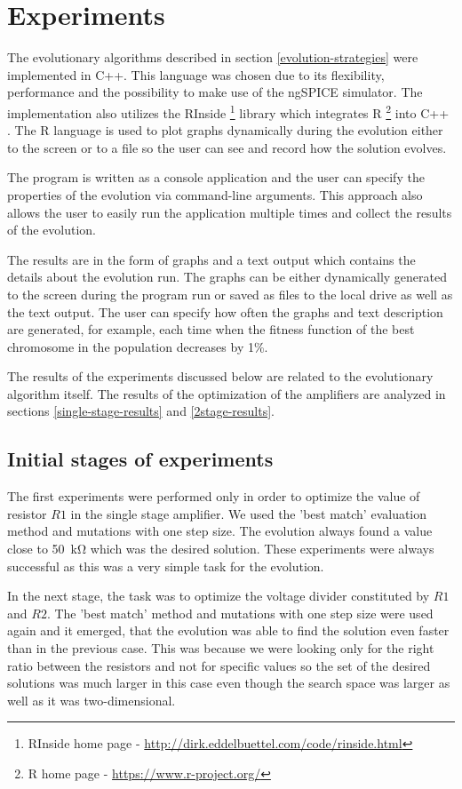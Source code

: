 \chapter{Experiments}
The evolutionary algorithms described in section \ref{evolution-strategies} were implemented in C++. This language was chosen due to its flexibility, performance and the possibility to make use of the ngSPICE simulator. The implementation also utilizes the RInside \footnote{RInside home page - \url{http://dirk.eddelbuettel.com/code/rinside.html}} library which integrates R \footnote{R home page - \url{https://www.r-project.org/}} into C++ \cite{Rcpp}. The R language is used to plot graphs dynamically during the evolution either to the screen or to a file so the user can see and record how the solution evolves.

The program is written as a console application and the user can specify the properties of the evolution via command-line arguments. This approach also allows the user to easily run the application multiple times and collect the results of the evolution.

The results are in the form of graphs and a text output which contains the details about the evolution run. The graphs can be either dynamically generated to the screen during the program run or saved as files to the local drive as well as the text output. The user can specify how often the graphs and text description are generated, for example, each time when the fitness function of the best chromosome in the population decreases by 1\%.

The results of the experiments discussed below are related to the evolutionary algorithm itself. The results of the optimization of the amplifiers are analyzed in sections \ref{single-stage-results} and \ref{2stage-results}.

\section{Initial stages of experiments}
The first experiments were performed only in order to optimize the value of resistor $R1$ in the single stage amplifier. We used the 'best match' evaluation method and mutations with one step size. The evolution always found a value close to \SI{50}{\kilo\ohm} which was the desired solution. These experiments were always successful as this was a very simple task for the evolution.

In the next stage, the task was to optimize the voltage divider constituted by $R1$ and $R2$. The 'best match' method and mutations with one step size were used again and it emerged, that the evolution was able to find the solution even faster than in the previous case. This was because we were looking only for the right ratio between the resistors and not for specific values so the set of the desired solutions was much larger in this case even though the search space was larger as well as it was two-dimensional.

